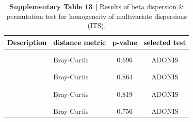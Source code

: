 \documentclass[
  10pt,
  letterpaper,
  DIV=11,
  numbers=noendperiod]{scrartcl}
\begin{document}
\begin{table}[H]

\caption{\textbf{Supplementary Table 13 |} Results of beta dispersion \& permutation test for homogeneity of multivariate dispersions (ITS).}
\centering
\fontsize{8}{10}\selectfont
\begin{tabular}[t]{llcc}
\toprule
\textcolor{black}{\textbf{Description}} & \textcolor{black}{\textbf{distance metric}} & \textcolor{black}{\textbf{p-value}} & \textcolor{black}{\textbf{selected test}}\\
\midrule
\addlinespace[-0.3em]
\multicolumn{4}{l}{\textbf{}}\\
\hspace{1em}\cellcolor{gray!6}{FULL data set} & \cellcolor{gray!6}{Jensen-Shannon} & \cellcolor{gray!6}{0.745} & \cellcolor{gray!6}{ADONIS}\\
\hspace{1em} & Bray-Curtis & 0.696 & ADONIS\\
\addlinespace[-0.3em]
\multicolumn{4}{l}{\textbf{}}\\
\hspace{1em}\cellcolor{gray!6}{Arbitrary filter} & \cellcolor{gray!6}{Jensen-Shannon} & \cellcolor{gray!6}{0.920} & \cellcolor{gray!6}{ADONIS}\\
\hspace{1em} & Bray-Curtis & 0.864 & ADONIS\\
\addlinespace[-0.3em]
\multicolumn{4}{l}{\textbf{}}\\
\hspace{1em}\cellcolor{gray!6}{PERFect filter} & \cellcolor{gray!6}{Jensen-Shannon} & \cellcolor{gray!6}{0.865} & \cellcolor{gray!6}{ADONIS}\\
\hspace{1em} & Bray-Curtis & 0.819 & ADONIS\\
\addlinespace[-0.3em]
\multicolumn{4}{l}{\textbf{}}\\
\hspace{1em}\cellcolor{gray!6}{PIME filter} & \cellcolor{gray!6}{Jensen-Shannon} & \cellcolor{gray!6}{0.704} & \cellcolor{gray!6}{ADONIS}\\
\hspace{1em} & Bray-Curtis & 0.756 & ADONIS\\
\bottomrule
\end{tabular}
\end{table}
\end{document}
